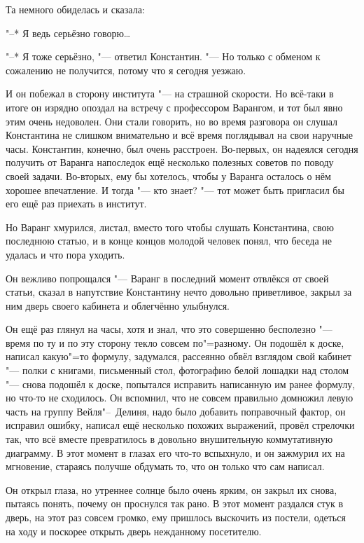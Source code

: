Та немного обиделась и сказала:

"--* Я ведь серьёзно говорю\ldots

"--* Я тоже серьёзно, "--- ответил Константин.
"--- Но только с обменом к сожалению не получится, потому что я сегодня уезжаю.

И он побежал в сторону института "--- на страшной скорости.
Но всё-таки в итоге он изрядно опоздал на встречу с профессором Варангом, и тот
был явно этим очень недоволен.
Они стали говорить, но во время разговора он слушал Константина не слишком
внимательно и всё время поглядывал на свои наручные часы.
Константин, конечно, был очень расстроен.
Во-первых, он надеялся сегодня получить от Варанга напоследок ещё несколько
полезных советов по поводу своей задачи.
Во-вторых, ему бы хотелось, чтобы у Варанга осталось о нём хорошее впечатление.
И тогда "--- кто знает? "--- тот может быть пригласил бы его ещё раз приехать в
институт.

Но Варанг хмурился, листал, вместо того чтобы слушать Константина, свою
последнюю статью, и в конце концов молодой человек понял, что беседа не удалась
и что пора уходить.

Он вежливо попрощался "--- Варанг в последний момент отвлёкся от своей статьи,
сказал в напутствие Константину нечто довольно приветливое, закрыл за ним дверь
своего кабинета и облегчённо улыбнулся.

Он ещё раз глянул на часы, хотя и знал, что это совершенно бесполезно "--- время
по ту и по эту сторону текло совсем по"=разному.
Он подошёл к доске, написал какую"=то формулу, задумался, рассеянно обвёл
взглядом свой кабинет "--- полки с книгами, письменный стол, фотографию белой
лошадки над столом "--- снова подошёл к доске, попытался исправить написанную
им ранее формулу, но что-то не сходилось.
Он вспомнил, что не совсем правильно домножил левую часть на группу
Вейля"--~Делиня, надо было добавить поправочный фактор, он исправил ошибку,
написал ещё несколько похожих выражений, провёл стрелочки так, что всё вместе
превратилось в довольно внушительную коммутативную диаграмму.
В этот момент в глазах его что-то вспыхнуло, и он зажмурил их на мгновение,
стараясь получше обдумать то, что он только что сам написал.

Он открыл глаза, но утреннее солнце было очень ярким, он закрыл их снова,
пытаясь понять, почему он проснулся так рано.
В этот момент раздался стук в дверь, на этот раз совсем громко, ему пришлось
выскочить из постели, одеться на ходу и поскорее открыть дверь нежданному
посетителю.

